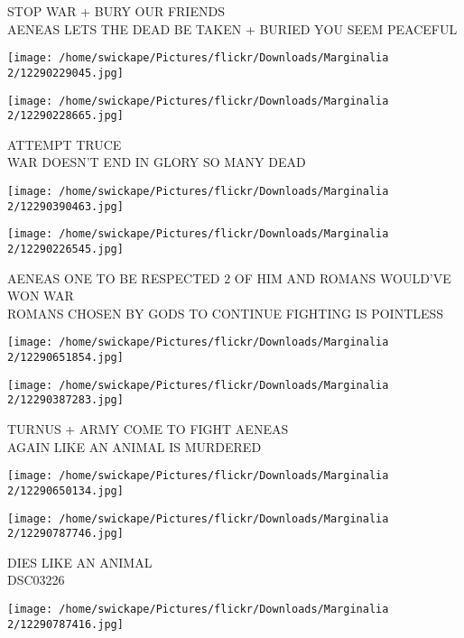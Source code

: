 \documentclass[10pt,letterpaper]{article}
\begin{document}
STOP WAR + BURY OUR FRIENDS\\
AENEAS LETS THE DEAD BE TAKEN + BURIED YOU SEEM PEACEFUL\\
\pagebreak

\texttt{[image: /home/swickape/Pictures/flickr/Downloads/Marginalia 2/12290229045.jpg]}

\vspace{0.25in}
\texttt{[image: /home/swickape/Pictures/flickr/Downloads/Marginalia 2/12290228665.jpg]}

ATTEMPT TRUCE\\
WAR DOESN'T END IN GLORY SO MANY DEAD\\
\pagebreak

\texttt{[image: /home/swickape/Pictures/flickr/Downloads/Marginalia 2/12290390463.jpg]}

\vspace{0.25in}
\texttt{[image: /home/swickape/Pictures/flickr/Downloads/Marginalia 2/12290226545.jpg]}

AENEAS ONE TO BE RESPECTED 2 OF HIM AND ROMANS WOULD'VE WON WAR\\
ROMANS CHOSEN BY GODS TO CONTINUE FIGHTING IS POINTLESS\\
\pagebreak

\texttt{[image: /home/swickape/Pictures/flickr/Downloads/Marginalia 2/12290651854.jpg]}

\vspace{0.25in}
\texttt{[image: /home/swickape/Pictures/flickr/Downloads/Marginalia 2/12290387283.jpg]}

TURNUS + ARMY COME TO FIGHT AENEAS\\
AGAIN LIKE AN ANIMAL IS MURDERED\\
\pagebreak

\texttt{[image: /home/swickape/Pictures/flickr/Downloads/Marginalia 2/12290650134.jpg]}

\vspace{0.25in}
\texttt{[image: /home/swickape/Pictures/flickr/Downloads/Marginalia 2/12290787746.jpg]}

DIES LIKE AN ANIMAL\\
DSC03226\\
\pagebreak

\texttt{[image: /home/swickape/Pictures/flickr/Downloads/Marginalia 2/12290787416.jpg]}
\end{document}
